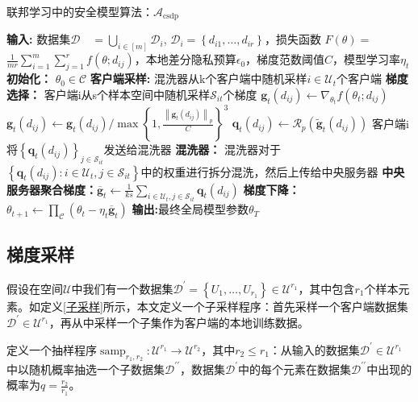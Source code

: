 \begin{algorithm}[!htb]
	\caption{联邦学习中的安全模型算法：$\mathcal{A}_{\text {csdp}}$}
	\label{联邦学习中的安全模型算法}
	\begin{algorithmic}[1]
		\footnotesize
		\STATE \textbf{输入:} 数据集$\mathcal{D} \quad=\bigcup_{i \in[m]} \mathcal{D}_{i}$, $\mathcal{D}_{i}=\left\{d_{i 1}, \ldots, d_{i r}\right\}$，损失函数 $F(\theta)=$ $\frac{1}{m r} \sum_{i=1}^{m} \sum_{j=1}^{r} f\left(\theta ; d_{i j}\right)$，本地差分隐私预算$\epsilon_{0}$，梯度范数阈值$C$，模型学习率$\eta_{t}$
		\STATE \textbf{初始化：} $\theta_{0} \in \mathcal{C}$
			\STATE \textbf{客户端采样:} 混洗器从k个客户端中随机采样$i \in \mathcal{U}_{t}$个客户端
				\STATE \textbf{梯度选择：} 客户端i从s个样本空间中随机采样$\mathcal{S}_{i t}$个梯度
					\STATE $\mathbf{g}_{t}\left(d_{i j}\right) \leftarrow \nabla_{\theta_{t}} f\left(\theta_{t} ; d_{i j}\right)$
					\STATE ${\mathbf{g}}_{t}\left(d_{i j}\right) \leftarrow \mathbf{g}_{t}\left(d_{i j}\right) / \max \left\{1, \frac{\left\|\mathbf{g}_{t}\left(d_{i j}\right)\right\|_{p}}{C}\right\}^{3}$
					\STATE $\mathbf{q}_{t}\left(d_{i j}\right) \leftarrow \mathcal{R}_{p}\left(\tilde{\mathbf{g}}_{t}\left(d_{i j}\right)\right)$
				\ENDFOR
				\STATE 客户端i将$\left\{\mathbf{q}_{t}\left(d_{i j}\right)\right\}_{j \in \mathcal{S}_{i t}}$发送给混洗器
			\ENDFOR
			\STATE \textbf{混洗器：} 混洗器对于$\left\{\boldsymbol{q}_{t}\left(d_{i j}\right): i \in \mathcal{U}_{t}, j \in \mathcal{S}_{i t}\right\}$中的权重进行拆分混洗，然后上传给中央服务器
			\STATE \textbf{中央服务器聚合梯度：}$\overline{\mathbf{g}}_{t} \leftarrow \frac{1}{k s} \sum_{i \in \mathcal{U}_{t}, j \in \mathcal{S}_{i t}} \boldsymbol{q}_{t}\left(d_{i j}\right)$
			\STATE \textbf{梯度下降：}$\theta_{t+1} \leftarrow \prod_{\mathcal{C}}\left(\theta_{t}-\eta_{t} \overline{\mathbf{g}}_{t}\right)$
		\ENDFOR
		\STATE \textbf{输出:}最终全局模型参数$\theta_{T}$

	\end{algorithmic}
\end{algorithm}

\newpage

\subsection{梯度采样}
假设在空间$\mathcal{U}$中我们有一个数据集$\mathcal{D}^{\prime}=\left\{U_{1}, \ldots, U_{r_{1}}\right\} \in \mathcal{U}^{r_{1}}$，其中包含$r_{1}$个样本元素。如定义\ref{子采样}所示，本文定义一个子采样程序：首先采样一个客户端数据集$\mathcal{D}^{\prime} \in \mathcal{U}^{r_{1}}$，再从中采样一个子集作为客户端的本地训练数据。
\begin{define}[子采样]\label{子采样}
定义一个抽样程序$\operatorname{samp}_{r_{1}, r_{2}}: \mathcal{U}^{r_{1}} \rightarrow \mathcal{U}^{r_{2}}$，其中$r_{2} \leq r_{1}$：从输入的数据集$\mathcal{D}^{\prime} \in \mathcal{U}^{r_{1}}$ 中以随机概率抽选一个子数据集$\mathcal{D}^{\prime \prime}$，数据集$\mathcal{D}^{\prime}$中的每个元素在数据集$\mathcal{D}^{\prime \prime}$中出现的概率为$q=\frac{r_{2}}{r_{1}}$。
\end{define}

